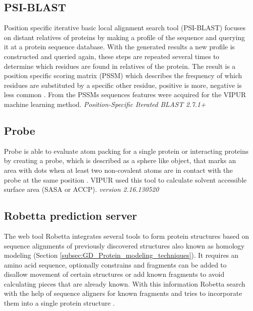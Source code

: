 \subsection{PSI-BLAST}
Position specific iterative basic local alignment search tool (PSI-BLAST) focuses on distant relatives of proteins by making a profile of the sequence and querying it at a protein sequence database. With the generated results a new profile is constructed and queried again, these steps are repeated several times to determine which residues are found in relatives of the protein. The result is a position specific scoring matrix (PSSM) which describes the frequency of which residues are substituted by a specific other residue, positive is more, negative is less common \cite{}.
From the PSSMs sequences features were acquired for the VIPUR machine learning method.
\label{subsec:MM_PSI_BLAST}
\newline
\textit{Position-Specific Iterated BLAST 2.7.1+}

\subsection{Probe}
Probe is able to evaluate atom packing for a single protein or interacting proteins by creating a probe, which is described as a sphere like object, that marks an area with dots when at least two non-covalent atoms are in contact with the probe at the same position \cite{}. VIPUR used this tool to calculate solvent accessible surface area (SASA or ACCP).
\label{subsec:MM_Probe}
\newline
\textit{version 2.16.130520}

\subsection{Robetta prediction server}
The web tool Robetta integrates several tools to form protein structures based on sequence alignments of previously discovered structures also known as homology modeling (Section \ref{subsec:GD_Protein_modeling_techniques}).
It requires an amino acid sequence, optionally constrains and fragments can be added to disallow movement of certain structures or add known fragments to avoid calculating pieces that are already known. With this information Robetta search with the help of sequence aligners for known fragments and tries to incorporate them into a single protein structure \cite{}.
\label{subsec:MM_Robetta}

